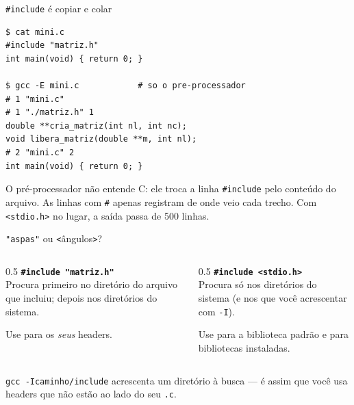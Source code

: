 \documentclass[aspectratio=169]{beamer}
\begin{document}
\begin{frame}[fragile]{\texttt{\#include} é copiar e colar}
\begin{lstlisting}[style=shellStyle]
$ cat mini.c
#include "matriz.h"
int main(void) { return 0; }

$ gcc -E mini.c            # so o pre-processador
# 1 "mini.c"
# 1 "./matriz.h" 1
double **cria_matriz(int nl, int nc);
void libera_matriz(double **m, int nl);
# 2 "mini.c" 2
int main(void) { return 0; }
\end{lstlisting}
  \begin{block}{}
    \small O pré-processador não entende C: ele troca a linha
    \texttt{\#include} pelo conteúdo do arquivo. As linhas com \texttt{\#}
    apenas registram de onde veio cada trecho. Com \texttt{<stdio.h>} no lugar,
    a saída passa de 500 linhas.
  \end{block}
\end{frame}

\begin{frame}{\texttt{"aspas"} ou \texttt{<}ângulos\texttt{>}?}
  \begin{columns}[T]
    \begin{column}{0.5\textwidth}
      \textbf{\texttt{\#include "matriz.h"}}\\[0.3em]
      Procura primeiro no diretório do arquivo que incluiu; depois nos
      diretórios do sistema.

      \medskip
      Use para os \emph{seus} headers.
    \end{column}
    \begin{column}{0.5\textwidth}
      \textbf{\texttt{\#include <stdio.h>}}\\[0.3em]
      Procura só nos diretórios do sistema (e nos que você acrescentar com
      \texttt{-I}).

      \medskip
      Use para a biblioteca padrão e para bibliotecas instaladas.
    \end{column}
  \end{columns}
  \begin{block}{}
    \small \texttt{gcc -Icaminho/include} acrescenta um diretório à busca ---
    é assim que você usa headers que não estão ao lado do seu \texttt{.c}.
  \end{block}
\end{frame}
\end{document}
